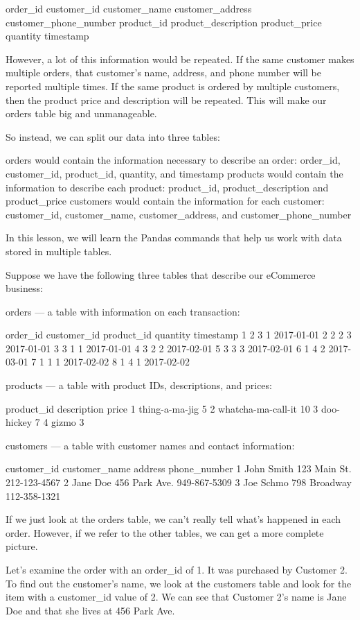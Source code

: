 \documentclass{journal}
\begin{document}
    order_id
    customer_id
    customer_name
    customer_address
    customer_phone_number
    product_id
    product_description
    product_price
    quantity
    timestamp

However, a lot of this information would be repeated. If the same customer makes multiple orders, that customer’s name, address, and phone number will be reported multiple times. If the same product is ordered by multiple customers, then the product price and description will be repeated. This will make our orders table big and unmanageable.

So instead, we can split our data into three tables:

    orders would contain the information necessary to describe an order: order_id, customer_id, product_id, quantity, and timestamp
    products would contain the information to describe each product: product_id, product_description and product_price
    customers would contain the information for each customer: customer_id, customer_name, customer_address, and customer_phone_number

In this lesson, we will learn the Pandas commands that help us work with data stored in multiple tables.


Suppose we have the following three tables that describe our eCommerce business:

    orders — a table with information on each transaction:

order_id	customer_id	product_id	quantity	timestamp
1	2	3	1	2017-01-01
2	2	2	3	2017-01-01
3	3	1	1	2017-01-01
4	3	2	2	2017-02-01
5	3	3	3	2017-02-01
6	1	4	2	2017-03-01
7	1	1	1	2017-02-02
8	1	4	1	2017-02-02

    products — a table with product IDs, descriptions, and prices:

product_id	description	price
1	thing-a-ma-jig	5
2	whatcha-ma-call-it	10
3	doo-hickey	7
4	gizmo	3

    customers — a table with customer names and contact information:

customer_id	customer_name	address	phone_number
1	John Smith	123 Main St.	212-123-4567
2	Jane Doe	456 Park Ave.	949-867-5309
3	Joe Schmo	798 Broadway	112-358-1321

If we just look at the orders table, we can’t really tell what’s happened in each order. However, if we refer to the other tables, we can get a more complete picture.

Let’s examine the order with an order_id of 1. It was purchased by Customer 2. To find out the customer’s name, we look at the customers table and look for the item with a customer_id value of 2. We can see that Customer 2’s name is Jane Doe and that she lives at 456 Park Ave.
\end{document}
